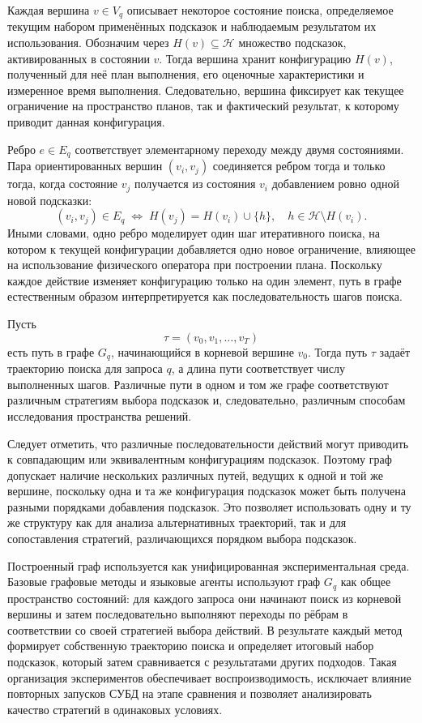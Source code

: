 Каждая вершина \(v \in V_q\) описывает некоторое состояние поиска, определяемое текущим набором применённых подсказок и наблюдаемым результатом их использования. Обозначим через \(H(v) \subseteq \mathcal{H}\) множество подсказок, активированных в состоянии \(v\). Тогда вершина хранит конфигурацию \(H(v)\), полученный для неё план выполнения, его оценочные характеристики и измеренное время выполнения. Следовательно, вершина фиксирует как текущее ограничение на пространство планов, так и фактический результат, к которому приводит данная конфигурация.

Ребро \(e \in E_q\) соответствует элементарному переходу между двумя состояниями. Пара ориентированных вершин \((v_i, v_j)\) соединяется ребром тогда и только тогда, когда состояние \(v_j\) получается из состояния \(v_i\) добавлением ровно одной новой подсказки:
\begin{equation}
    (v_i, v_j) \in E_q
    \;\Longleftrightarrow\;
    H(v_j) = H(v_i) \cup \{h\}, \quad h \in \mathcal{H} \setminus H(v_i).
\end{equation}
Иными словами, одно ребро моделирует один шаг итеративного поиска, на котором к текущей конфигурации добавляется одно новое ограничение, влияющее на использование физического оператора при построении плана. Поскольку каждое действие изменяет конфигурацию только на один элемент, путь в графе естественным образом интерпретируется как последовательность шагов поиска.

Пусть
\begin{equation}
    \tau = (v_0, v_1, \dots, v_T)
\end{equation}
есть путь в графе \(G_q\), начинающийся в корневой вершине \(v_0\). Тогда путь \(\tau\) задаёт траекторию поиска для запроса \(q\), а длина пути соответствует числу выполненных шагов. Различные пути в одном и том же графе соответствуют различным стратегиям выбора подсказок и, следовательно, различным способам исследования пространства решений.

Следует отметить, что различные последовательности действий могут приводить к совпадающим или эквивалентным конфигурациям подсказок. Поэтому граф допускает наличие нескольких различных путей, ведущих к одной и той же вершине, поскольку одна и та же конфигурация подсказок может быть получена разными порядками добавления подсказок. Это позволяет использовать одну и ту же структуру как для анализа альтернативных траекторий, так и для сопоставления стратегий, различающихся порядком выбора подсказок.

Построенный граф используется как унифицированная экспериментальная среда. Базовые графовые методы и языковые агенты используют граф \(G_q\) как общее пространство состояний: для каждого запроса они начинают поиск из корневой вершины и затем последовательно выполняют переходы по рёбрам в соответствии со своей стратегией выбора действий. В результате каждый метод формирует собственную траекторию поиска и определяет итоговый набор подсказок, который затем сравнивается с результатами других подходов. Такая организация экспериментов обеспечивает воспроизводимость, исключает влияние повторных запусков СУБД на этапе сравнения и позволяет анализировать качество стратегий в одинаковых условиях.

